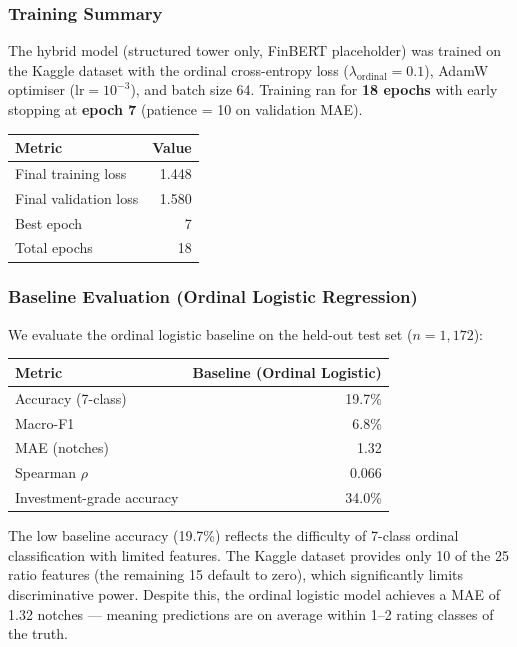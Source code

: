 \documentclass[12pt, a4paper]{article}
\begin{document}
\subsubsection{Training Summary}

The hybrid model (structured tower only, FinBERT placeholder) was trained on the Kaggle dataset with the ordinal cross-entropy loss ($\lambda_{\text{ordinal}} = 0.1$), AdamW optimiser ($\text{lr} = 10^{-3}$), and batch size 64.  Training ran for \textbf{18 epochs} with early stopping at \textbf{epoch 7} (patience = 10 on validation MAE).

\begin{center}
\begin{tabular}{l r}
  \toprule
  \textbf{Metric} & \textbf{Value} \\
  \midrule
  Final training loss  & 1.448 \\
  Final validation loss & 1.580 \\
  Best epoch           & 7 \\
  Total epochs         & 18 \\
  \bottomrule
\end{tabular}
\end{center}

\subsubsection{Baseline Evaluation (Ordinal Logistic Regression)}

We evaluate the ordinal logistic baseline on the held-out test set ($n = 1{,}172$):

\begin{center}
\begin{tabular}{l r}
  \toprule
  \textbf{Metric} & \textbf{Baseline (Ordinal Logistic)} \\
  \midrule
  Accuracy (7-class)       & 19.7\% \\
  Macro-F1                 & 6.8\% \\
  MAE (notches)            & 1.32 \\
  Spearman $\rho$          & 0.066 \\
  Investment-grade accuracy & 34.0\% \\
  \bottomrule
\end{tabular}
\end{center}

\noindent The low baseline accuracy (19.7\%) reflects the difficulty of 7-class ordinal classification with limited features.  The Kaggle dataset provides only 10 of the 25 ratio features (the remaining 15 default to zero), which significantly limits discriminative power.  Despite this, the ordinal logistic model achieves a MAE of 1.32 notches --- meaning predictions are on average within 1--2 rating classes of the truth.
\end{document}
